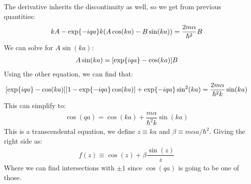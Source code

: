 The derivative inherits the discontinuity as well, so we get from previous quantities:
\begin{align*}
  kA-\exp{-iqa}k\qty(A\cos(ka)-B\sin(ka))=\dfrac{2m\alpha}{\hbar^2}B
\end{align*}
We can solve for $A\sin(ka)$:
\begin{align*}
  A\sin(ka)=\qty[\exp{iqa}-\cos(ka)]B
\end{align*}
Using the other equation, we can find that:
\begin{align*}
  \qty[\exp{iqa}-\cos(ka)]\qty[1-\exp{-iqa}\cos(ka)]+\exp{-iqa}\sin^2(ka)=
  \dfrac{2m\alpha}{\hbar^2k}\sin(ka)
\end{align*}
This can simplify to:
\begin{align*}
  \cos(qa)=\cos(ka)+\dfrac{m\alpha}{\hbar^2k}\sin(ka)
\end{align*}
This is a transcendental equation, we define $z\equiv ka$ and $\beta\equiv m\alpha a/\hbar^2$. Giving the right side as:
\begin{align*}
  f(z)\equiv\cos(z)+\beta\dfrac{\sin(z)}{z}
\end{align*}
Where we can find intersections with $\pm1$ since $\cos(qa)$ is going to be one of those. 
